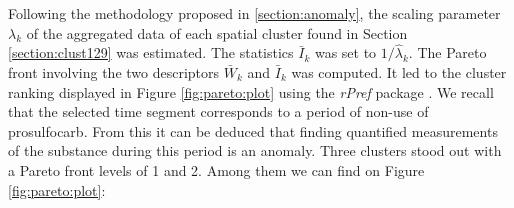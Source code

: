 
Following the methodology proposed in \ref{section:anomaly}, the scaling parameter $\lambda_k$ of the aggregated data of each spatial cluster found in Section \ref{section:clust129} was estimated. The statistics $\bar{I}_k$ was set to $1/\hat{\lambda}_k$. The Pareto front involving the two descriptors $\bar{W}_k$ and $\bar{I}_k$ was computed. It led to the cluster ranking displayed in Figure \ref{fig:pareto:plot} using the \emph{rPref} package \cite{RJ-2016-054}. We recall that the selected time segment corresponds to a period of non-use of prosulfocarb. From this it can be deduced that finding quantified measurements of the substance during this period is an anomaly. Three clusters stood out with a Pareto front levels of 1 and 2. Among them we can find on Figure \ref{fig:pareto:plot}: 
